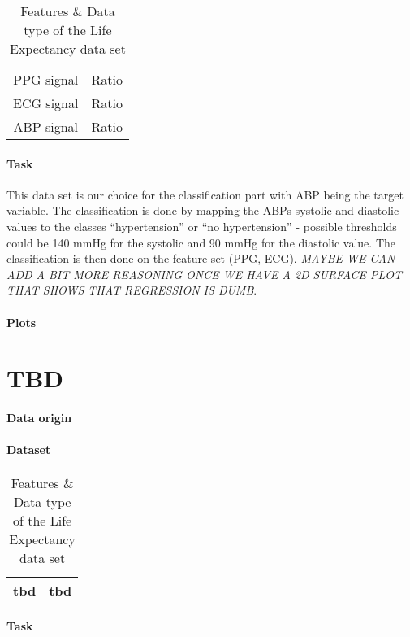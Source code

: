 \documentclass[12pt, DIV=13, titlepage, headinclude]{scrartcl}
\begin{document}
\begin{table}[H]
    \centering
        \begin{tabular}{ c c }
            \toprule
            PPG signal & Ratio \\
            ECG signal & Ratio \\
						ABP signal & Ratio \\
            \bottomrule
        \end{tabular}
    \caption{Features \& Data type of the Life Expectancy data set}
    \label{tab:bloodPress}
\end{table}

\paragraph{Task}

This data set is our choice for the classification part with ABP being the target variable. The classification is done by mapping the ABPs systolic and diastolic values to the classes \enquote{hypertension} or \enquote{no hypertension} - possible thresholds could be 140 mmHg for the systolic and 90 mmHg for the diastolic value. The classification is then done on the feature set (PPG, ECG). \textit{MAYBE WE CAN ADD A BIT MORE REASONING ONCE WE HAVE A 2D SURFACE PLOT THAT SHOWS THAT REGRESSION IS DUMB}.

\paragraph{Plots}

\newpage
\section*{TBD}

\paragraph{Data origin}

\paragraph{Dataset}

\begin{table}[H]
    \centering
        \begin{tabular}{ c c }
            \toprule
						tbd & tbd \\
            \bottomrule
        \end{tabular}
    \caption{Features \& Data type of the Life Expectancy data set}
    \label{tab:lifeexp}
\end{table}

\paragraph{Task}


\newpage
\nocite{*}
\printbibliography
\end{document}
